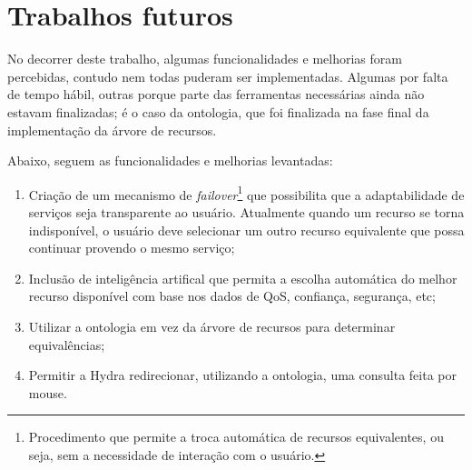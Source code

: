\section{Trabalhos futuros}

No decorrer deste trabalho, algumas funcionalidades e melhorias foram percebidas, contudo nem todas puderam ser implementadas. Algumas por falta de tempo hábil, outras porque parte das ferramentas necessárias ainda não estavam finalizadas; é o caso da ontologia, que foi finalizada na fase final da implementação da árvore de recursos.

Abaixo, seguem as funcionalidades e melhorias levantadas:

\begin{enumerate}
	\item Criação de um mecanismo de \emph{failover}\footnote{Procedimento que permite a troca automática de recursos equivalentes, ou seja, sem a necessidade de interação com o usuário.} que possibilita que a adaptabilidade de serviços seja transparente ao usuário. Atualmente quando um recurso se torna indisponível, o usuário deve selecionar um outro recurso equivalente que possa continuar provendo o mesmo serviço;
	\item Inclusão de inteligência artifical que permita a escolha automática do melhor recurso disponível com base nos dados de QoS, confiança, segurança, etc;
	\item Utilizar a ontologia em vez da árvore de recursos para determinar equivalências;
	\item Permitir a Hydra redirecionar, utilizando a ontologia, uma consulta feita por mouse.
\end{enumerate}